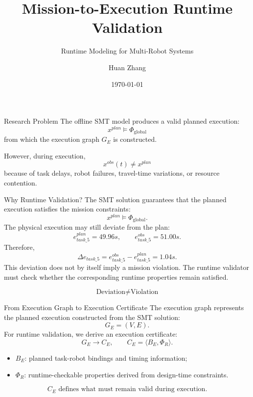 \documentclass[aspectratio=169]{beamer}
\title{Mission-to-Execution Runtime Validation}
\subtitle{Runtime Modeling for Multi-Robot Systems}
\author{Huan Zhang}
\date{\today}
\begin{document}
\begin{frame}
\titlepage
\end{frame}

\begin{frame}{Research Problem}
The offline SMT model produces a valid planned execution:
\[
x^{plan} \models \Phi_{\mathrm{global}}
\]
from which the execution graph $G_E$ is constructed.

However, during execution,
\[
x^{obs}(t) \neq x^{plan}
\]
because of task delays, robot failures, travel-time variations, or resource contention.

\begin{center}
\end{center}
\end{frame}

\begin{frame}{Why Runtime Validation?}
The SMT solution guarantees that the planned execution satisfies the mission constraints:
\[
x^{plan} \models \Phi_{\mathrm{global}}.
\]
The physical execution may still deviate from the plan:
\[
e_{task\_5}^{plan}=49.96s,\qquad e_{task\_5}^{obs}=51.00s.
\]
Therefore,
\[
\Delta e_{task\_5}=e_{task\_5}^{obs}-e_{task\_5}^{plan}=1.04s.
\]
This deviation does not by itself imply a mission violation. The runtime validator must check whether the corresponding runtime properties remain satisfied.

\[
\boxed{\text{Deviation} \neq \text{Violation}}
\]
\end{frame}

\begin{frame}{From Execution Graph to Execution Certificate}
The execution graph represents the planned execution constructed from the SMT solution:
\[
G_E=(V,E).
\]
For runtime validation, we derive an execution certificate:
\[
G_E \longrightarrow C_E,\qquad
C_E=\langle B_E,\Phi_R\rangle.
\]
\begin{itemize}
    \item $B_E$: planned task-robot bindings and timing information;
    \item $\Phi_R$: runtime-checkable properties derived from design-time constraints.
\end{itemize}

\[
\boxed{C_E \text{ defines what must remain valid during execution.}}
\]
\end{frame}
\end{document}
